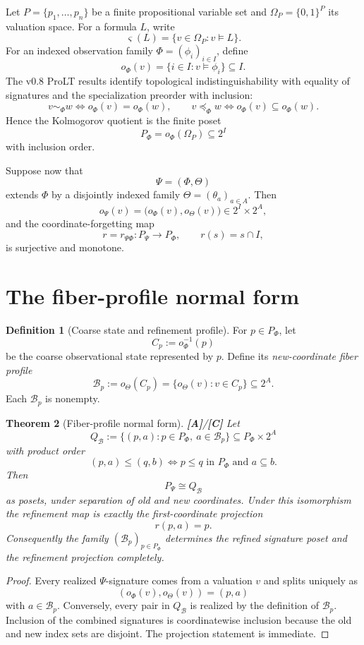 \documentclass[11pt]{article}
\newtheorem{theorem}{Theorem}[section]
\theoremstyle{definition}
\newtheorem{definition}[theorem]{Definition}
\newcommand{\Om}{\Omega_P}
\newcommand{\truth}{\varsigma}
\newcommand{\statusA}{\textbf{[A]}}
\newcommand{\statusC}{\textbf{[C]}}
\begin{document}
Let \(P=\{p_1,\dots,p_n\}\) be a finite propositional variable set and \(\Om=\{0,1\}^P\) its valuation space. For a formula \(L\), write
\[
\truth(L)=\{v\in\Om:v\models L\}.
\]
For an indexed observation family \(\Phi=(\phi_i)_{i\in I}\), define
\[
o_\Phi(v)=\{i\in I:v\models\phi_i\}\subseteq I.
\]
The v0.8 ProLT results identify topological indistinguishability with equality of signatures and the specialization preorder with inclusion:
\[
v\sim_\Phi w\iff o_\Phi(v)=o_\Phi(w),
\qquad
v\preceq_\Phi w\iff o_\Phi(v)\subseteq o_\Phi(w).
\]
Hence the Kolmogorov quotient is the finite poset
\[
P_\Phi=o_\Phi(\Om)\subseteq 2^I
\]
with inclusion order.

Suppose now that
\[
\Psi=(\Phi,\Theta)
\]
extends \(\Phi\) by a disjointly indexed family \(\Theta=(\theta_a)_{a\in A}\). Then
\[
o_\Psi(v)=\bigl(o_\Phi(v),o_\Theta(v)\bigr)
\in 2^I\times 2^A,
\]
and the coordinate-forgetting map
\[
r=r_{\Psi\Phi}:P_\Psi\to P_\Phi,
\qquad
r(s)=s\cap I,
\]
is surjective and monotone.

\section{The fiber-profile normal form}

\begin{definition}[Coarse state and refinement profile]\label{def:profile}
For \(p\in P_\Phi\), let
\[
C_p:=o_\Phi^{-1}(p)
\]
be the coarse observational state represented by \(p\). Define its \emph{new-coordinate fiber profile}
\[
\mathcal B_p:=o_\Theta(C_p)
=\{o_\Theta(v):v\in C_p\}\subseteq 2^A.
\]
Each \(\mathcal B_p\) is nonempty.
\end{definition}

\begin{theorem}[Fiber-profile normal form]\label{thm:normalform}
\statusA/\statusC\;
Let
\[
Q_{\mathcal B}
:=\{(p,a):p\in P_\Phi,\ a\in\mathcal B_p\}
\subseteq P_\Phi\times2^A
\]
with product order
\[
(p,a)\le(q,b)
\iff p\le q\text{ in }P_\Phi\text{ and }a\subseteq b.
\]
Then
\[
P_\Psi\cong Q_{\mathcal B}
\]
as posets, under separation of old and new coordinates. Under this isomorphism the refinement map is exactly the first-coordinate projection
\[
r(p,a)=p.
\]
Consequently the family \((\mathcal B_p)_{p\in P_\Phi}\) determines the refined signature poset and the refinement projection completely.
\end{theorem}

\begin{proof}
Every realized \(\Psi\)-signature comes from a valuation \(v\) and splits uniquely as
\[
(o_\Phi(v),o_\Theta(v))=(p,a)
\]
with \(a\in\mathcal B_p\). Conversely, every pair in \(Q_{\mathcal B}\) is realized by the definition of \(\mathcal B_p\). Inclusion of the combined signatures is coordinatewise inclusion because the old and new index sets are disjoint. The projection statement is immediate.
\end{proof}
\end{document}
